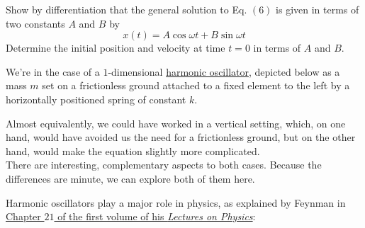 \documentclass[solutions.tex]{subfiles}
\begin{document}
\maketitle
\begin{exercise}
Show by differentiation that the general solution to Eq. $(6)$
is given in terms of two constants $A$ and $B$ by
\[
	x(t) = A\cos\omega t + B\sin\omega t
\]
Determine the initial position and velocity at time $t=0$ in terms
of $A$ and $B$.
\end{exercise}
We're in the case of a $1$-dimensional
\href{https://en.wikipedia.org/wiki/Harmonic\_oscillator}
{harmonic oscillator}, depicted below as a mass $m$ set on a frictionless
ground attached to a fixed element to the left by a horizontally positioned
spring of constant $k$.
\begin{figure}[H]
	\centering
\end{figure}
\begin{remark}
Almost equivalently, we could have worked in a vertical setting, which, on
one hand, would have avoided us the need for a frictionless ground, but
on the other hand, would make the equation slightly more complicated. \\

There are interesting, complementary aspects to both cases. Because
the differences are minute, we can explore both of them here.
\end{remark}

Harmonic oscillators play a major role in physics, as explained by Feynman
in \href{https://www.feynmanlectures.caltech.edu/I\_21.html}{Chapter $21$
of the first volume of his \textit{Lectures on Physics}}:
\end{document}
